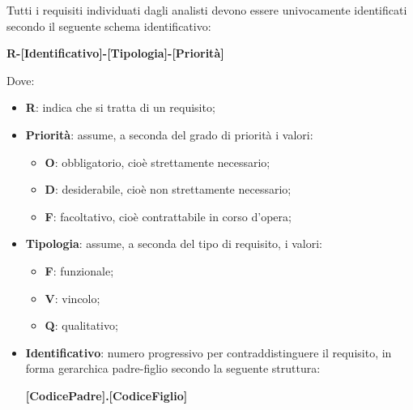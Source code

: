 Tutti i requisiti individuati dagli analisti devono essere univocamente identificati secondo il seguente schema identificativo:

\begin{center}
    \textbf{R-[Identificativo]-[Tipologia]-[Priorit\`{a}]}
\end{center}

Dove:

\begin{itemize}
    \item \textbf{R}: indica che si tratta di un requisito;
    \item \textbf{Priorit\`{a}}: assume, a seconda del grado di priorit\`{a} i valori:
    \begin{itemize}
        \item \textbf{O}: obbligatorio, cio\`{e} strettamente necessario;
        \item \textbf{D}: desiderabile, cio\`{e} non strettamente necessario;
        \item \textbf{F}: facoltativo, cio\`{e} contrattabile in corso d'opera;
    \end{itemize}
    \item \textbf{Tipologia}: assume, a seconda del tipo di requisito, i valori:
    \begin{itemize}
        \item \textbf{F}: funzionale;
        \item \textbf{V}: vincolo;
        \item \textbf{Q}: qualitativo;
    \end{itemize}
    \item \textbf{Identificativo}: numero progressivo per contraddistinguere il requisito, in forma gerarchica padre-figlio secondo la seguente struttura:
    \begin{center}
        \textbf{[CodicePadre].[CodiceFiglio]}
    \end{center}
\end{itemize}